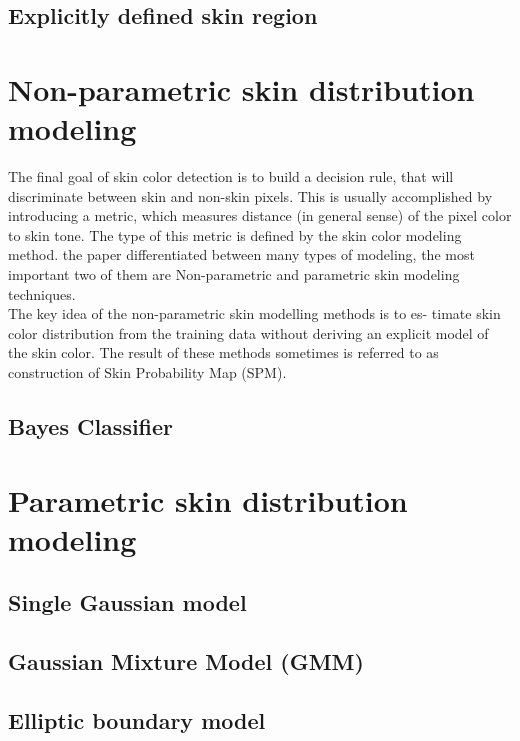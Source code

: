 \documentclass[12pt]{article} %
\begin{document}
\subsection{Explicitly defined skin region} 


\section{Non-parametric skin distribution modeling} %
The final goal of skin color detection is to build a decision rule, that will discriminate between skin and non-skin pixels. This is usually accomplished by introducing a metric, which measures distance (in general sense) of the pixel color to skin tone. The type of this metric is defined by the skin color modeling method. the paper differentiated between many types of modeling, the most important two of them are Non-parametric and parametric skin modeling techniques.\\

The key idea of the non-parametric skin modelling methods is to es-
timate skin color distribution from the training data without deriving an explicit model of the skin color. The result of these methods sometimes is referred to as construction of Skin Probability Map (SPM).





\subsection{Bayes Classifier} 



\section{Parametric skin distribution modeling} %


\subsection{Single Gaussian model } 

\subsection{Gaussian Mixture Model (GMM)}

\subsection{Elliptic boundary model}
\end{document}
